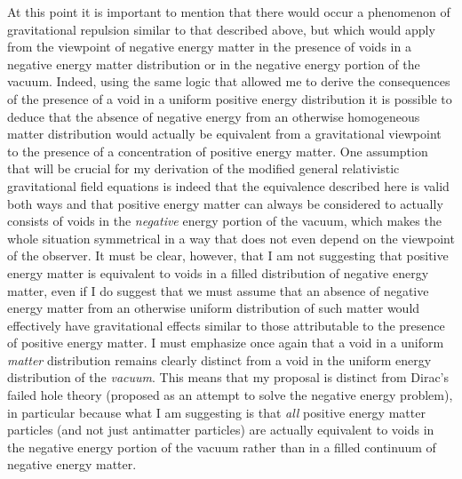 \documentclass[notitlepage,12pt]{report}
\begin{document}
\noindent At this point it is important to mention that there would occur a phenomenon of gravitational repulsion similar to that described above, but which would apply from the viewpoint of negative energy matter in the presence of voids in a negative energy matter distribution or in the negative energy portion of the vacuum. Indeed, using the same logic that allowed me to derive the consequences of the presence of a void in a uniform positive energy distribution it is possible to deduce that the absence of negative energy from an otherwise homogeneous matter distribution would actually be equivalent from a gravitational viewpoint to the presence of a concentration of positive energy matter. One assumption that will be crucial for my derivation of the modified general relativistic gravitational field equations is indeed that the equivalence described here is valid both ways and that positive energy matter can always be considered to actually consists of voids in the \textit{negative} energy portion of the vacuum, which makes the whole situation symmetrical in a way that does not even depend on the viewpoint of the observer. It must be clear, however, that I am not suggesting that positive energy matter is equivalent to voids in a filled distribution of negative energy matter, even if I do suggest that we must assume that an absence of negative energy matter from an otherwise uniform distribution of such matter would effectively have gravitational effects similar to those attributable to the presence of positive energy matter. I must emphasize once again that a void in a uniform \textit{matter} distribution remains clearly distinct from a void in the uniform energy distribution of the \textit{vacuum}. This means that my proposal is distinct from Dirac's failed hole theory (proposed as an attempt to solve the negative energy problem), in particular because what I am suggesting is that \textit{all} positive energy matter particles (and not just antimatter particles) are actually equivalent to voids in the negative energy portion of the vacuum rather than in a filled continuum of negative energy matter.
\end{document}
